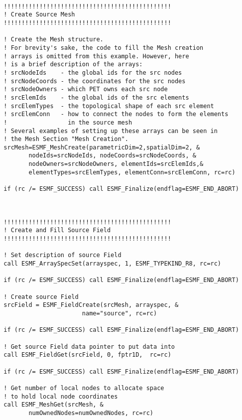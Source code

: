
 \begin{verbatim}

  !!!!!!!!!!!!!!!!!!!!!!!!!!!!!!!!!!!!!!!!!!!!!!!
  ! Create Source Mesh
  !!!!!!!!!!!!!!!!!!!!!!!!!!!!!!!!!!!!!!!!!!!!!!!

  ! Create the Mesh structure.
  ! For brevity's sake, the code to fill the Mesh creation 
  ! arrays is omitted from this example. However, here
  ! is a brief description of the arrays:
  ! srcNodeIds    - the global ids for the src nodes
  ! srcNodeCoords - the coordinates for the src nodes
  ! srcNodeOwners - which PET owns each src node
  ! srcElemIds    - the global ids of the src elements
  ! srcElemTypes  - the topological shape of each src element
  ! srcElemConn   - how to connect the nodes to form the elements
  !                 in the source mesh
  ! Several examples of setting up these arrays can be seen in
  ! the Mesh Section "Mesh Creation". 
  srcMesh=ESMF_MeshCreate(parametricDim=2,spatialDim=2, &
         nodeIds=srcNodeIds, nodeCoords=srcNodeCoords, &
         nodeOwners=srcNodeOwners, elementIds=srcElemIds,&
         elementTypes=srcElemTypes, elementConn=srcElemConn, rc=rc)

  if (rc /= ESMF_SUCCESS) call ESMF_Finalize(endflag=ESMF_END_ABORT)



  !!!!!!!!!!!!!!!!!!!!!!!!!!!!!!!!!!!!!!!!!!!!!!!
  ! Create and Fill Source Field
  !!!!!!!!!!!!!!!!!!!!!!!!!!!!!!!!!!!!!!!!!!!!!!!

  ! Set description of source Field
  call ESMF_ArraySpecSet(arrayspec, 1, ESMF_TYPEKIND_R8, rc=rc)

  if (rc /= ESMF_SUCCESS) call ESMF_Finalize(endflag=ESMF_END_ABORT)

  ! Create source Field
  srcField = ESMF_FieldCreate(srcMesh, arrayspec, &
                        name="source", rc=rc)

  if (rc /= ESMF_SUCCESS) call ESMF_Finalize(endflag=ESMF_END_ABORT)

  ! Get source Field data pointer to put data into
  call ESMF_FieldGet(srcField, 0, fptr1D,  rc=rc)

  if (rc /= ESMF_SUCCESS) call ESMF_Finalize(endflag=ESMF_END_ABORT)

  ! Get number of local nodes to allocate space
  ! to hold local node coordinates
  call ESMF_MeshGet(srcMesh, &
         numOwnedNodes=numOwnedNodes, rc=rc)


\end{verbatim}
